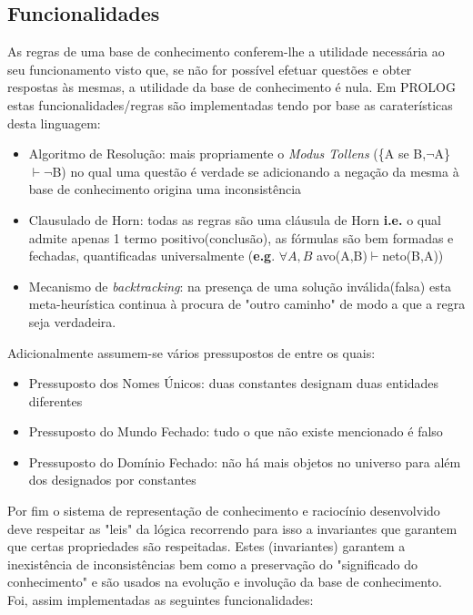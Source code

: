 \documentclass{article}
\begin{document}
\subsection{Funcionalidades}
As regras de uma base de conhecimento conferem-lhe a utilidade necessária ao seu funcionamento visto que, se não for possível efetuar questões e obter respostas às mesmas, a utilidade da base de conhecimento é nula. Em PROLOG estas funcionalidades/regras são implementadas tendo por base as caraterísticas desta linguagem:
\begin{itemize} 
	\item Algoritmo de Resolução: mais propriamente o \textit{Modus Tollens} (\{A se B,$\neg$A\}$\vdash\neg$B) no qual uma questão é verdade se adicionando a negação da mesma à base de conhecimento origina uma inconsistência
    \item Clausulado de Horn: todas as regras são uma cláusula de Horn \textbf{i.e.} o qual admite apenas 1 termo positivo(conclusão), as fórmulas são bem formadas e fechadas, quantificadas universalmente (\textbf{e.g}. $\forall{A,B}$ avo(A,B)$\vdash$neto(B,A))
    \item Mecanismo de \textit{backtracking}: na presença de uma solução inválida(falsa) esta meta-heurística continua à procura de "outro caminho" de modo a que a regra seja verdadeira.
\end{itemize}
Adicionalmente assumem-se vários pressupostos de entre os quais:
\begin{itemize}
	\item Pressuposto dos Nomes Únicos: duas constantes designam duas entidades diferentes
    \item Pressuposto do Mundo Fechado: tudo o que não existe mencionado é falso
    \item Pressuposto do Domínio Fechado: não há mais objetos no universo para além dos designados por constantes
\end{itemize}
Por fim o sistema de representação de conhecimento e raciocínio desenvolvido deve respeitar as "leis" da lógica recorrendo para isso a invariantes que garantem que certas propriedades são respeitadas. Estes (invariantes) garantem a inexistência de inconsistências bem como a preservação do "significado do conhecimento" e são usados na evolução e involução da base de conhecimento.
\newline
Foi, assim implementadas as seguintes funcionalidades:
\end{document}
